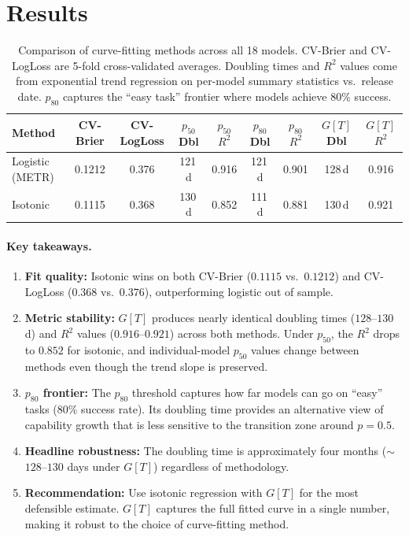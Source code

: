 \documentclass[11pt,a4paper]{article}
\begin{document}
\section{Results}
\label{sec:results}

\begin{table}[H]
\centering
\caption{Comparison of curve-fitting methods across all 18 models.
CV-Brier and CV-LogLoss are 5-fold cross-validated averages.
Doubling times and $R^2$ values come from exponential trend regression on per-model summary statistics vs.\ release date.
$p_{80}$ captures the ``easy task'' frontier where models achieve 80\% success.}
\label{tab:results}
\begin{tabular}{@{}lcccccccc@{}}
\toprule
\textbf{Method} & \textbf{CV-Brier} & \textbf{CV-LogLoss} & \textbf{$p_{50}$ Dbl} & \textbf{$p_{50}$ $R^2$} & \textbf{$p_{80}$ Dbl} & \textbf{$p_{80}$ $R^2$} & \textbf{$G[T]$ Dbl} & \textbf{$G[T]$ $R^2$} \\
\midrule
Logistic (METR)     & 0.1212 & 0.376 & 121\,d & 0.916 & 121\,d & 0.901 & 128\,d & 0.916 \\
Isotonic            & 0.1115 & 0.368 & 130\,d & 0.852 & 111\,d & 0.881 & 130\,d & 0.921 \\
\bottomrule
\end{tabular}
\end{table}

\paragraph{Key takeaways.}
\begin{enumerate}
  \item \textbf{Fit quality:} Isotonic wins on both CV-Brier ($0.1115$ vs.\ $0.1212$) and CV-LogLoss ($0.368$ vs.\ $0.376$), outperforming logistic out of sample.
  \item \textbf{Metric stability:} $G[T]$ produces nearly identical doubling times ($128$--$130$\,d) and $R^2$ values ($0.916$--$0.921$) across both methods.
        Under $p_{50}$, the $R^2$ drops to $0.852$ for isotonic, and individual-model $p_{50}$ values change between methods even though the trend slope is preserved.
  \item \textbf{$p_{80}$ frontier:} The $p_{80}$ threshold captures how far models can go on ``easy'' tasks (80\% success rate). Its doubling time provides an alternative view of capability growth that is less sensitive to the transition zone around $p = 0.5$.
  \item \textbf{Headline robustness:} The doubling time is approximately four months ($\sim$\!$128$--$130$ days under $G[T]$) regardless of methodology.
  \item \textbf{Recommendation:} Use isotonic regression with $G[T]$ for the most defensible estimate. $G[T]$ captures the full fitted curve in a single number, making it robust to the choice of curve-fitting method.
\end{enumerate}
\end{document}
